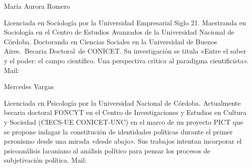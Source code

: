 María Aurora Romero

Licenciada en Sociología por la Universidad Empresarial Siglo 21. Maestranda en Sociología en el Centro de Estudios Avanzados de la Universidad Nacional de Córdoba. Doctoranda en Ciencias Sociales en la Universidad de Buenos Aires.~Becaria Doctoral~de CONICET. Su investigación se titula «Entre el saber y el poder: el campo científico. Una perspectiva crítica al paradigma cientificista». Mail:

Mercedes Vargas

Licenciada en Psicología por la Universidad Nacional de Córdoba. Actualmente becaria doctoral FONCYT en el Centro de Investigaciones y Estudios en Cultura y Sociedad (CIECS-UE CONICET-UNC) en el marco de un proyecto PICT que se propone indagar la constitución de identidades políticas durante el primer peronismo desde una mirada «desde abajo». Sus trabajos intentan incorporar el psicoanálisis lacaniano al análisis político para pensar los procesos de subjetivación política. Mail:


